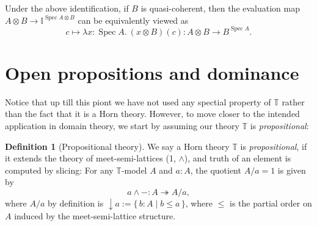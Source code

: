 \documentclass[12pt]{amsart}
\newtheorem{proposition}[theorem]{Proposition}
\theoremstyle{definition}
\newtheorem{definition}[theorem]{Definition}
\newtheorem{remark}[theorem]{Remark}
\newcommand{\mb}[1]{\mathbf{#1}}
\newcommand{\mbb}[1]{\mathbb{#1}}
\newcommand{\T}{\mbb T}
\newcommand{\I}{\mbb I}
\newcommand{\alg}{\text{-}\mb{Alg}}
\newcommand{\scomp}[2]{\{\,#1\mid#2\,\}}
\newcommand{\surj}{\twoheadrightarrow}
\newcommand{\cv}{\operatorname{\downarrow}}
\newcommand{\ld}[2]{\lambda #1\!\colon\!\!#2.\ }
\newcommand{\spec}{\operatorname{Spec}}
\begin{document}
Under the above identification, if $B$ is quasi-coherent, then the evaluation map $A \otimes B \to \I^{\spec A \otimes B}$ can be equivalently viewed as
\[ c \mapsto \ld{x}{\spec A} (x\otimes B)(c) : A \otimes B \to B^{\spec A}. \]






\section{Open propositions and dominance}\label{sec:dominance}

Notice that up till this piont we have not used any spectial property of $\T$ rather than the fact that it is a Horn theory. However, to move closer to the intended application in domain theory, we start by assuming our theory $\T$ is \emph{propositional}: 

\begin{definition}[Propositional theory]\label{defn:propositional}
  We say a Horn theory $\T$ is \emph{propositional}, if it extends the theory of meet-semi-lattices (1, $\wedge$), and truth of an element is computed by slicing: For any $\T$-model $A$ and $a:A$, the quotient $A/a=1$ is given by
  \[ a \wedge - : A \surj A/a, \]
  where $A/a$ by definition is $\cv a := \scomp{b:A}{b\le a}$, where $\le$ is the partial order on $A$ induced by the meet-semi-lattice structure.
\end{definition}
\end{document}
